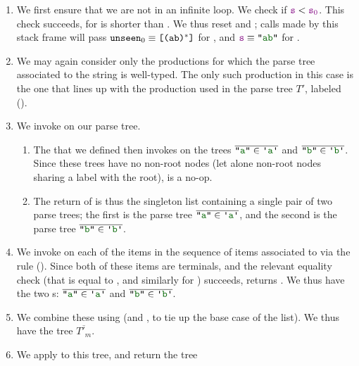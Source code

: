 \begin{enumerate}
        \begin{enumerate}
          \item
            We first ensure that we are not in an infinite loop.  We check if $\textcolor{violet}{\texttt{s}} < \textcolor{violet}{\texttt{s$_0$}}$.  This check succeeds, for  is shorter than .  We thus reset  and ; calls made by this stack frame will pass $\texttt{unseen$_0$}\equiv \texttt{[}\texttt{(ab)$^*$}\texttt{]}$ for , and $\farg{s} \equiv \str{ab}$ for .
          \item
            We may again consider only the productions for which the parse tree associated to the string is well-typed.  The only such production in this case is the one that lines up with the production used in the parse tree $T'$, labeled ().
          \item
            We invoke  on our parse tree.
            \begin{enumerate}
              \item
                The  that we defined then invokes  on the trees $\overline{\str{a}\in \terminal{a}}$ and $\overline{\str{b}\in \terminal{b}}$.  Since these trees have no non-root nodes (let alone non-root nodes sharing a label with the root),  is a no-op.
              \item
                The return of  is thus the singleton list containing a single pair of two parse trees; the first is the parse tree $\overline{\str{a}\in \terminal{a}}$, and the second is the parse tree $\overline{\str{b}\in \terminal{b}}$.
            \end{enumerate}
          \item
            We invoke  on each of the items in the sequence of items associated to  via the rule ().  Since both of these items are terminals, and the relevant equality check (that  is equal to , and similarly for ) succeeds,  returns .  We thus have the two s: $\overline{\str{a}\in \terminal{a}}$ and $\overline{\str{b}\in \terminal{b}}$.
          \item
            We combine these using  (and , to tie up the base case of the list).  We thus have the tree $\overline{T'_m}$.
          \item
            We apply  to this tree, and return the tree

\end{enumerate}
\end{enumerate}
